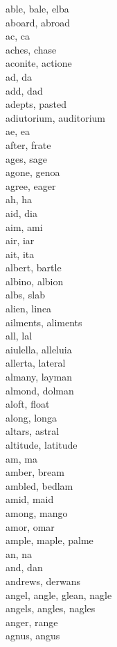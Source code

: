able, bale, elba\\
aboard, abroad\\
ac, ca\\
aches, chase\\
aconite, actione\\
ad, da\\
add, dad\\
adepts, pasted\\
adiutorium, auditorium\\
ae, ea\\
after, frate\\
ages, sage\\
agone, genoa\\
agree, eager\\
ah, ha\\
aid, dia\\
aim, ami\\
air, iar\\
ait, ita\\
albert, bartle\\
albino, albion\\
albs, slab\\
alien, linea\\
ailments, aliments\\
all, lal\\
aiulella, alleluia\\
allerta, lateral\\
almany, layman\\
almond, dolman\\
aloft, float\\
along, longa\\
altars, astral\\
altitude, latitude\\
am, ma\\
amber, bream\\
ambled, bedlam\\
amid, maid\\
among, mango\\
amor, omar\\
ample, maple, palme\\
an, na\\
and, dan\\
andrews, derwans\\
angel, angle, glean, nagle\\
angels, angles, nagles\\
anger, range\\
agnus, angus\\
